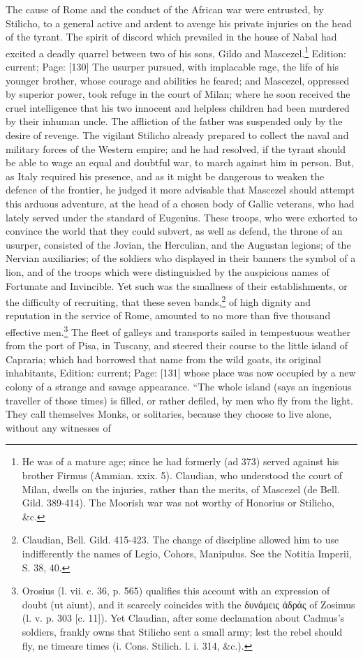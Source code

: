 The cause of Rome and the conduct of the African war were entrusted, by Stilicho, to a general active and ardent to avenge his private injuries on the head of the tyrant. The spirit of discord which prevailed in the house of Nabal had excited a deadly quarrel between two of his sons, Gildo and Mascezel.\footnote{He was of a mature age; since he had formerly (ad 373) served against his brother Firmus (Ammian. xxix. 5). Claudian, who understood the court of Milan, dwells on the injuries, rather than the merits, of Mascezel (de Bell. Gild. 389-414). The Moorish war was not worthy of Honorius or Stilicho, \&c.} Edition: current; Page: [130] The usurper pursued, with implacable rage, the life of his younger brother, whose courage and abilities he feared; and Mascezel, oppressed by superior power, took refuge in the court of Milan; where he soon received the cruel intelligence that his two innocent and helpless children had been murdered by their inhuman uncle. The affliction of the father was suspended only by the desire of revenge. The vigilant Stilicho already prepared to collect the naval and military forces of the Western empire; and he had resolved, if the tyrant should be able to wage an equal and doubtful war, to march against him in person. But, as Italy required his presence, and as it might be dangerous to weaken the defence of the frontier, he judged it more advisable that Mascezel should attempt this arduous adventure, at the head of a chosen body of Gallic veterans, who had lately served under the standard of Eugenius. These troops, who were exhorted to convince the world that they could subvert, as well as defend, the throne of an usurper, consisted of the Jovian, the Herculian, and the Augustan legions; of the Nervian auxiliaries; of the soldiers who displayed in their banners the symbol of a lion, and of the troops which were distinguished by the auspicious names of Fortunate and Invincible. Yet such was the smallness of their establishments, or the difficulty of recruiting, that these seven bands,\footnote{Claudian, Bell. Gild. 415-423. The change of discipline allowed him to use indifferently the names of Legio, Cohors, Manipulus. See the Notitia Imperii, S. 38, 40.} of high dignity and reputation in the service of Rome, amounted to no more than five thousand effective men.\footnote{Orosius (l. vii. c. 36, p. 565) qualifies this account with an expression of doubt (ut aiunt), and it scarcely coincides with the \textgreek{δυνάμεις \texthebrew{ἁ}δράς} of Zosimus (l. v. p. 303 [c. 11]). Yet Claudian, after some declamation about Cadmus\texthebrew{}’s soldiers, frankly owns that Stilicho sent a small army; lest the rebel should fly, ne timeare times (i. Cons. Stilich. l. i. 314, \&c.).} The fleet of galleys and transports sailed in tempestuous weather from the port of Pisa, in Tuscany, and steered their course to the little island of Capraria; which had borrowed that name from the wild goats, its original inhabitants, Edition: current; Page: [131] whose place was now occupied by a new colony of a strange and savage appearance. \texthebrew{“}The whole island (says an ingenious traveller of those times) is filled, or rather defiled, by men who fly from the light. They call themselves Monks, or solitaries, because they choose to live alone, without any witnesses of 